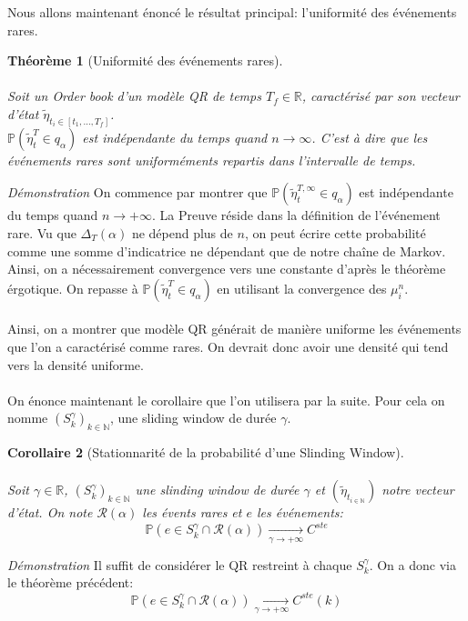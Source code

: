 \documentclass[12pt,a4paper]{article}
\newtheorem{theorem}{Théorème}[section]
\newtheorem{corollary}[theorem]{Corollaire}
\theoremstyle{definition}
\theoremstyle{remark}
\begin{document}
Nous allons maintenant énoncé le résultat principal: l'uniformité des événements rares.
\begin{theorem}[Uniformité des événements rares]
\\
\\
Soit un Order book d'un modèle QR de temps $T_f\in \mathbb{R}$, caractérisé par son vecteur d'état $\tilde \eta_{t_i\in [t_1,\dots,T_f]}$.
\\
$\mathbb{P}\left(\tilde\eta_t^T\in q_{\alpha}\right)$ est indépendante du temps quand $n\to\infty$. C'est à dire que les événements rares sont uniforméments repartis dans l'intervalle de temps.

\end{theorem}
\textit{Démonstration} On commence par montrer que $\mathbb{P}\left(\tilde\eta_t^{T,\infty}\in q_{\alpha}\right)$ est indépendante du temps quand $n\to+\infty$. La Preuve réside dans la définition de l'événement rare. Vu que $\Delta_T(\alpha)$ ne dépend plus de $n$, on peut écrire cette probabilité comme une somme d'indicatrice ne dépendant que de notre chaîne de Markov. Ainsi, on a nécessairement convergence vers une constante d'après le théorème érgotique. On repasse à $\mathbb{P}\left(\tilde\eta_t^T\in q_{\alpha}\right)$ en utilisant la convergence des $\mu_i^n$.
\\
\\
Ainsi, on a montrer que modèle QR générait de manière uniforme les événements que l'on a caractérisé comme rares. On devrait donc avoir une densité qui tend vers la densité uniforme. 
\\
\\
On énonce maintenant le corollaire que l'on utilisera par la suite. Pour cela on nomme $(S^\gamma_{k})_{k\in \mathbb{N}}$, une sliding window de durée $\gamma$.
\begin{corollary}[Stationnarité de la probabilité d'une Slinding Window] 
\\
\\
Soit $\gamma \in \mathbb{R}$, $(S^\gamma_{k})_{k\in \mathbb{N}}$ une slinding window de durée $\gamma$ et $(\tilde\eta_{t_{i\in \mathbb{N}}})$ notre vecteur d'état. On note $\mathcal{R}(\alpha)$ les évents rares et $e$ les événements:
$$\mathbb{P}\left(e\in S^{\gamma}_k \cap \mathcal{R}(\alpha)\right)\underset{\gamma\to+\infty}{\to}C^{ste}$$
\end{corollary}
\textit{Démonstration} Il suffit de considérer le QR restreint à chaque $S^{\gamma}_k$. On a donc via le théorème précédent:
$$\mathbb{P}\left(e\in S^{\gamma}_k \cap \mathcal{R}(\alpha)\right)\underset{\gamma\to+\infty}{\to}C^{ste}(k)$$
\end{document}
